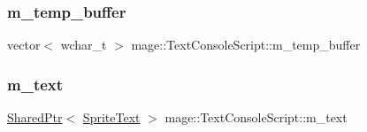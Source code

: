 \hypertarget{classmage_1_1_text_console_script_a6500bfd006f5c90d05f3da7f3e8e75a8}{}\label{classmage_1_1_text_console_script_a6500bfd006f5c90d05f3da7f3e8e75a8} 
\subsubsection{\texorpdfstring{m\+\_\+temp\+\_\+buffer}{m\_temp\_buffer}}
{\footnotesize\ttfamily vector$<$ wchar\+\_\+t $>$ mage\+::\+Text\+Console\+Script\+::m\+\_\+temp\+\_\+buffer\hspace{0.3cm}{\ttfamily [private]}}

\hypertarget{classmage_1_1_text_console_script_a761287353d8f9b031beb890c9f6c7203}{}\label{classmage_1_1_text_console_script_a761287353d8f9b031beb890c9f6c7203} 
\subsubsection{\texorpdfstring{m\+\_\+text}{m\_text}}
{\footnotesize\ttfamily \hyperlink{namespacemage_a1e01ae66713838a7a67d30e44c67703e}{Shared\+Ptr}$<$ \hyperlink{classmage_1_1_sprite_text}{Sprite\+Text} $>$ mage\+::\+Text\+Console\+Script\+::m\+\_\+text\hspace{0.3cm}{\ttfamily [private]}}

